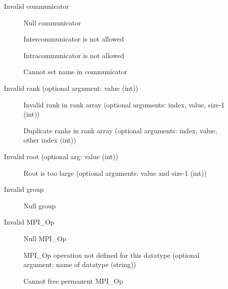 \begin{description}
\item[]Invalid communicator
    \begin{description}
    \item[]Null communicator
    \item[]Intercommunicator is not allowed
    \item[]Intracommunicator is not allowed
    \item[]Cannot set name in communicator
    \end{description}
\item[]Invalid rank (optional argument: value (int))
    \begin{description}
    \item[]Invalid rank in rank array (optional
      arguments: index, value, size-1 (int))
    \item[]Duplicate ranks in rank array
      (optional arguments: index, value, other index (int))
    \end{description}
\item[]Invalid root (optional arg: value (int))
    \begin{description}
    \item[]Root is too large (optional
      arguments: value and size-1 (int))
    \end{description}
\item[]Invalid group
    \begin{description}
    \item[]Null group
    \end{description}
\item[]Invalid MPI_Op
    \begin{description}
    \item[]Null MPI_Op
    \item[]MPI_Op operation not defined for
      this datatype (optional argument: name of datatype (string))
    \item[]Cannot free permanent MPI_Op

\end{description}
\end{description}
